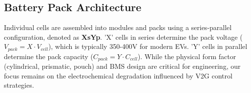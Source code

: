 \begin{table}[h!]
\centering
\caption{Comparative analysis of key automotive battery chemistries\footcite{blomgren2017development, wang2012thermal}.}
\label{tab:chem_comparison_detailed}
\end{table}

\subsection{Battery Pack Architecture}
Individual cells are assembled into modules and packs using a series-parallel configuration, denoted as \textbf{XsYp}. 'X' cells in series determine the pack voltage ($V_{pack} = X \cdot V_{cell}$), which is typically 350-400V for modern EVs. 'Y' cells in parallel determine the pack capacity ($C_{pack} = Y \cdot C_{cell}$). While the physical form factor (cylindrical, prismatic, pouch) and BMS design are critical for engineering, our focus remains on the electrochemical degradation influenced by V2G control strategies.